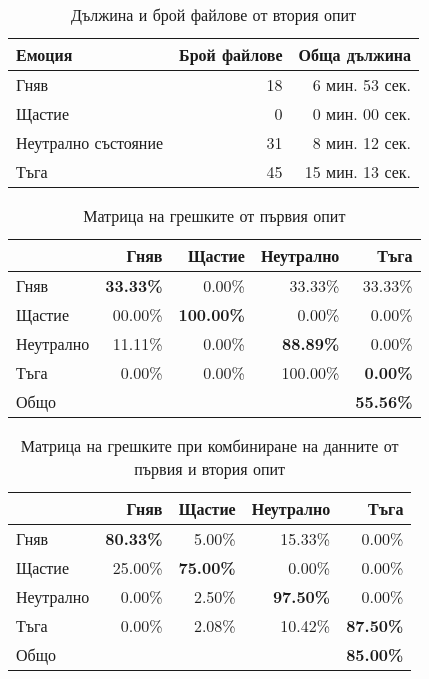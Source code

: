 \documentclass[main.tex]{subfiles}
\begin{document}
\begin{table}[h]
    \begin{center}
    \begin{tabular}{|l|r|r|} 
        \hline
        Емоция & Брой файлове & Обща дължина\\ 
        \hline
        Гняв & 18 & 6 мин. 53 сек.\\ 
        Щастие & 0 & 0 мин. 00 сек. \\ 
        Неутрално състояние & 31 & 8 мин. 12 сек. \\ 
        Тъга & 45 & 15 мин. 13 сек. \\ 
        \hline
    \end{tabular}
    \caption{Дължина и брой файлове от втория опит}
    \label{tab:brain:results:02}
    \end{center}
\end{table}


\begin{table}[h]
    \begin{center}
    \begin{tabular}{|l|r r r r|} 
        \hline
        & Гняв & Щастие & Неутрално & Тъга \\ 
        \hline
        Гняв &  \textbf{33.33\%} & 0.00\% & 33.33\% & 33.33\% \\ 
        Щастие & 00.00\% & \textbf{100.00\%} & 0.00\% & 0.00\% \\ 
        Неутрално & 11.11\% & 0.00\% & \textbf{88.89\%} & 0.00\% \\ 
        Тъга & 0.00\% & 0.00\% & 100.00\% & \textbf{0.00\%}\\ 
        \hline
        \hline
        Общо & & & & \textbf{55.56\%}\\
        \hline
    \end{tabular}
    \caption{Матрица на грешките от първия опит}
    \label{tab:brain:results:03}
    \end{center}
\end{table}


\begin{table}[h]
    \begin{center}
    \begin{tabular}{|l|r r r r|} 
        \hline
        & Гняв & Щастие & Неутрално & Тъга \\ 
        \hline
        Гняв &  \textbf{80.33\%} & 5.00\% & 15.33\% & 0.00\% \\ 
        Щастие & 25.00\% & \textbf{75.00\%} & 0.00\% & 0.00\% \\ 
        Неутрално & 0.00\% & 2.50\% & \textbf{97.50\%} & 0.00\% \\ 
        Тъга & 0.00\% & 2.08\% & 10.42\% & \textbf{87.50\%}\\ 
        \hline
        \hline
        Общо & & & & \textbf{85.00\%}\\
        \hline
    \end{tabular}
    \caption{Матрица на грешките при комбиниране на данните от първия и втория опит}
    \label{tab:brain:results:04}
    \end{center}
\end{table}
\end{document}
